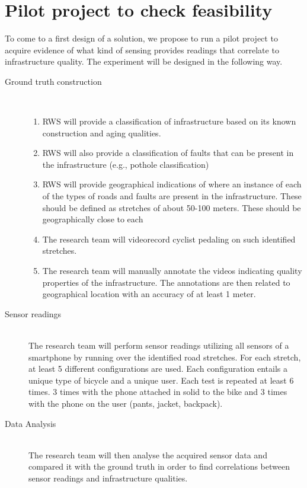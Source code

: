 \documentclass[preprint,12pt]{elsarticle}
\theoremstyle{definition}
\begin{document}
\section{Pilot project to check feasibility}

To come to a first design of a solution, we propose to run a
pilot project to acquire evidence of what kind of sensing provides
readings that correlate to infrastructure quality. The experiment will
be designed in the following way.

\begin{description}
\item[Ground truth construction]\mbox{}\\[-2ex]
\noindent
  \begin{enumerate}
  \item RWS will provide a classification of
    infrastructure based on its known construction and aging
    qualities. 
  \item RWS will also provide a classification of faults that can be
    present in the infrastructure (e.g., pothole classification)
  \item RWS will provide geographical indications of where an instance
    of each of the types of roads and faults are present in the
    infrastructure. These should be defined as stretches of about
    50-100 meters. These should be geographically close to each 
    \item The research team will videorecord cyclist pedaling on such
      identified stretches.
    \item The research team will manually annotate the videos
      indicating quality properties of the infrastructure. The
      annotations are then related to geographical location with an
      accuracy of at least 1 meter.
\end{enumerate}

\item[Sensor readings]\mbox{}\\
      The research team will perform sensor readings utilizing all
      sensors of a smartphone by running over the identified road
      stretches. For each stretch, at least 5 different configurations
      are used. Each configuration entails a unique type of bicycle
      and a unique user. Each test is repeated at least 6 times. 3
      times with the phone attached in solid to the bike and 3
      times with the phone on the user (pants, jacket, backpack).

\item[Data Analysis]\mbox{}\\
      The research team will then analyse the acquired sensor data and
      compared it with the ground truth in order to find correlations
      between sensor readings and infrastructure qualities. 
\end{description} 
\end{document}
